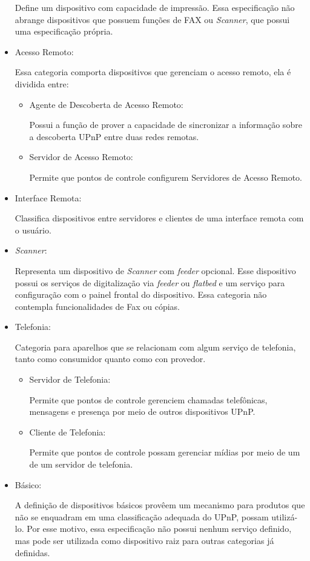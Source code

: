 \begin{itemize}
	Define um dispositivo com capacidade de impressão. Essa especificação não abrange dispositivos que possuem funções de FAX ou \emph{Scanner}, que possui uma especificação própria.

\item Acesso Remoto:

	Essa categoria comporta dispositivos que gerenciam o acesso remoto, ela é dividida entre:
	\begin{itemize}
		\item Agente de Descoberta de Acesso Remoto:

			Possui a função de prover a capacidade de sincronizar a informação sobre a descoberta UPnP entre duas redes remotas.
		
		\item Servidor de Acesso Remoto:
		
			Permite que pontos de controle configurem Servidores de Acesso Remoto.

	\end{itemize}

\item Interface Remota:

	Classifica dispositivos entre servidores e clientes de uma interface remota com o usuário.

\item \emph{Scanner}:

	Representa um dispositivo de \emph{Scanner} com \emph{feeder} opcional. Esse dispositivo possui os serviços de digitalização via \emph{feeder} ou \emph{flatbed} e um serviço para configuração com o painel frontal do dispositivo. Essa categoria não contempla funcionalidades de Fax ou cópias.

\item Telefonia:
	
	Categoria para aparelhos que se relacionam com algum serviço de telefonia, tanto como consumidor quanto como con provedor.
	\begin{itemize}
		\item Servidor de Telefonia:

			Permite que pontos de controle gerenciem chamadas telefônicas, mensagens e presença por meio de outros dispositivos UPnP. 

		\item Cliente de Telefonia:
		
			Permite que pontos de controle possam gerenciar mídias por meio de um de um servidor de telefonia.
				
	\end{itemize}

\item Básico:

	A definição de dispositivos básicos provêem um mecanismo para produtos que não se enquadram em uma classificação adequada do UPnP, possam utilizá-lo. Por esse motivo, essa especificação não possui nenhum serviço definido, mas pode ser utilizada como dispositivo raiz para outras categorias já definidas.
\end{itemize}


